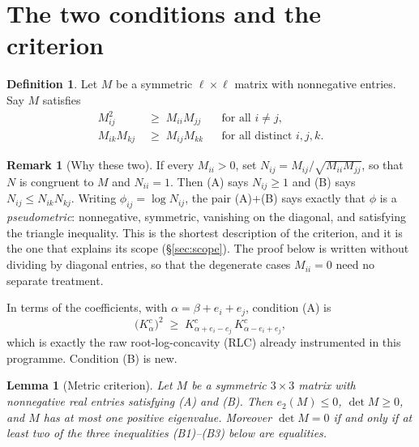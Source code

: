 \documentclass[11pt]{article}
\theoremstyle{plain}
\newtheorem{lemma}[theorem]{Lemma}
\theoremstyle{definition}
\newtheorem{definition}[theorem]{Definition}
\newtheorem{remark}[theorem]{Remark}
\begin{document}
\section{The two conditions and the criterion}

\begin{definition}\label{def:AB}
Let $M$ be a symmetric $\ell\times\ell$ matrix with nonnegative entries. Say $M$ satisfies
\begin{align}
\tag{A} M_{ij}^2 &\;\ge\; M_{ii}M_{jj} &&\text{for all } i\ne j,\\
\tag{B} M_{ik}M_{kj} &\;\ge\; M_{ij}M_{kk} &&\text{for all distinct } i,j,k.
\end{align}
\end{definition}

\begin{remark}[Why these two]\label{rem:metric}
If every $M_{ii}>0$, set $N_{ij}=M_{ij}/\sqrt{M_{ii}M_{jj}}$, so that $N$ is congruent to $M$ and
$N_{ii}=1$. Then (A) says $N_{ij}\ge1$ and (B) says $N_{ij}\le N_{ik}N_{kj}$. Writing
$\phi_{ij}=\log N_{ij}$, the pair (A)+(B) says exactly that $\phi$ is a \emph{pseudometric}:
nonnegative, symmetric, vanishing on the diagonal, and satisfying the triangle inequality. This is
the shortest description of the criterion, and it is the one that explains its scope
(\S\ref{sec:scope}). The proof below is written without dividing by diagonal entries, so that the
degenerate cases $M_{ii}=0$ need no separate treatment.
\end{remark}

In terms of the coefficients, with $\alpha=\beta+e_i+e_j$, condition (A) is
\[
\big(K^c_\alpha\big)^2\;\ge\;K^c_{\alpha+e_i-e_j}\,K^c_{\alpha-e_i+e_j},
\]
which is exactly the raw root-log-concavity (RLC) already instrumented in this programme.
Condition (B) is new.

\begin{lemma}[Metric criterion]\label{lem:metric}
Let $M$ be a symmetric $3\times3$ matrix with nonnegative real entries satisfying \textup{(A)} and
\textup{(B)}. Then $e_2(M)\le0$, $\det M\ge0$, and $M$ has at most one positive eigenvalue.
Moreover $\det M=0$ if and only if at least two of the three inequalities
\textup{(B1)--(B3)} below are equalities.
\end{lemma}
\end{document}
